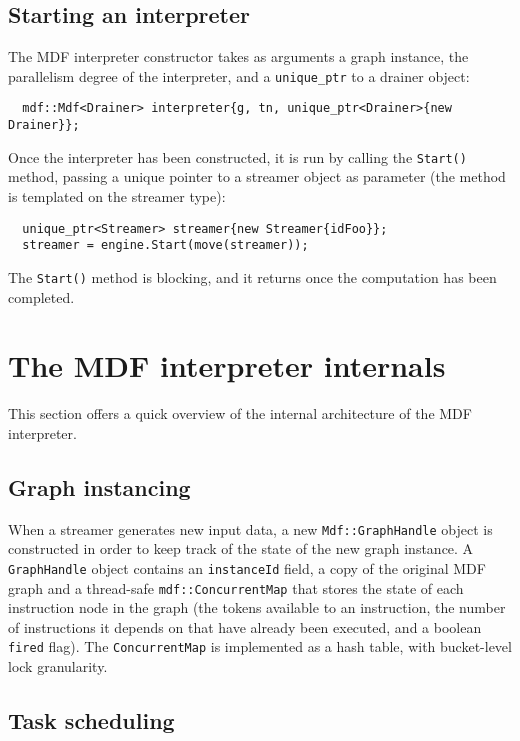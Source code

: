 \documentclass[a4paper, 11pt, oneside]{article}
\begin{document}
\subsection{Starting an interpreter}

The MDF interpreter constructor takes as arguments a graph instance, the parallelism degree of the interpreter, and a \texttt{unique\_ptr} to a drainer object:
\begin{verbatim}
  mdf::Mdf<Drainer> interpreter{g, tn, unique_ptr<Drainer>{new Drainer}};
\end{verbatim}
Once the interpreter has been constructed, it is run  by calling the \texttt{Start()} method, passing a unique pointer to a streamer object as parameter (the method is templated on the streamer type):
\begin{verbatim}
  unique_ptr<Streamer> streamer{new Streamer{idFoo}};
  streamer = engine.Start(move(streamer));
\end{verbatim}

The \texttt{Start()} method is blocking, and it returns once the computation has been completed.

\section{The MDF interpreter internals}

This section offers a quick overview of the internal architecture of the MDF interpreter.

\subsection{Graph instancing}

When a streamer generates new input data, a new \texttt{Mdf::GraphHandle} object is constructed in order to keep track of the state of the new graph instance. A \texttt{GraphHandle} object contains an \texttt{instanceId} field, a copy of the original MDF graph and a thread-safe \texttt{mdf::ConcurrentMap} that stores the state of each instruction node in the graph (the tokens available to an instruction, the number of instructions it depends on that have already been executed, and a boolean \texttt{fired} flag). The \texttt{ConcurrentMap} is implemented as a hash table, with bucket-level lock granularity.

\subsection{Task scheduling}
\end{document}
